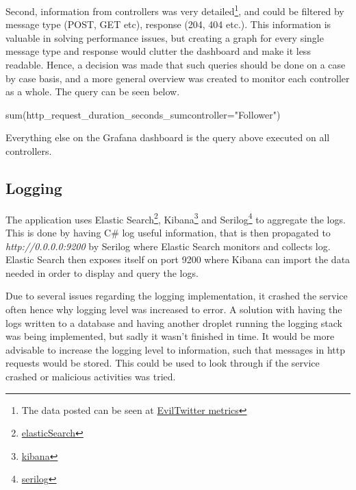 \documentclass[report/main.tex]{subfiles}
\begin{document}
            Second, information from controllers was very detailed\footnote{The data posted can be seen at \href{http://159.89.213.38:5010/metrics}{EvilTwitter metrics}}, and could be filtered by message type (POST, GET etc), response (204, 404 etc.). This information is valuable in solving performance issues, but creating a graph for every single message type and response would clutter the dashboard and make it less readable. Hence, a decision was made that such queries should be done on a case by case basis, and a more general overview was created to monitor each controller as a whole. The query can be seen below.
                
            \begin{center}
                sum(http\_request\_duration\_seconds\_sum{controller="Follower"})
            \end{center}
            
            Everything else on the Grafana dashboard is the query above executed on all controllers. 
                

        \subsection{Logging}
        \label{SubSec:logging}
            The application uses Elastic Search\footnote{\href{https://www.elastic.co/elasticsearch/}{elasticSearch}}, Kibana\footnote{\href{https://www.elastic.co/kibana}{kibana}} and Serilog\footnote{\href{https://serilog.net/}{serilog}} to aggregate the logs. This is done by having C\# log useful information, that is then propagated to \textit{http://0.0.0.0:9200} by Serilog where Elastic Search monitors and collects log. Elastic Search then exposes itself on port 9200 where Kibana can import the data needed in order to display and query the logs.
            
            Due to several issues regarding the logging implementation, it crashed the service often hence why logging level was increased to error. A solution with having the logs written to a database and having another droplet running the logging stack was being implemented, but sadly it wasn't finished in time. It would be more advisable to increase the logging level to information, such that messages in http requests would be stored. This could be used to look through if the service crashed or malicious activities was tried. 
            
\end{document}
